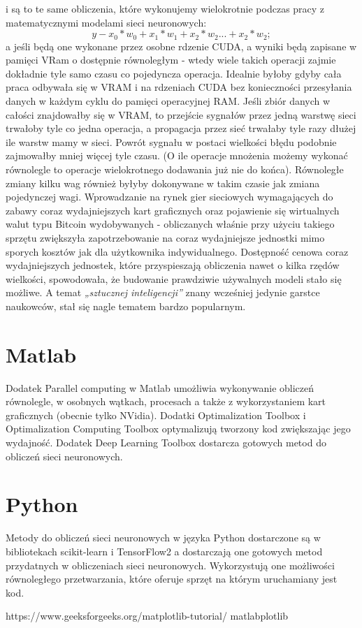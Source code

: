 i są to te same obliczenia, które wykonujemy wielokrotnie podczas pracy z matematycznymi modelami sieci neuronowych:
\begin{equation*}
  y - x_0*w_0 + x_1*w_1 +x_2*w_2 ... +x_2*w_2;
\end{equation*}
a jeśli będą one wykonane przez osobne rdzenie CUDA, a wyniki będą zapisane w pamięci VRam o dostępnie równoległym - wtedy wiele takich operacji zajmie dokładnie tyle samo czasu co pojedyncza operacja. Idealnie byłoby gdyby cała praca odbywała się w VRAM i na rdzeniach CUDA bez konieczności przesyłania danych w każdym cyklu do pamięci operacyjnej RAM. Jeśli zbiór danych w całości znajdowałby się w VRAM, to przejście sygnałów przez jedną warstwę sieci trwałoby tyle co jedna operacja, a propagacja przez sieć trwałaby tyle razy dłużej ile warstw mamy w sieci. Powrót sygnału w postaci wielkości błędu podobnie zajmowałby mniej więcej tyle czasu. (O ile operacje mnożenia możemy wykonać równolegle to operacje wielokrotnego dodawania już nie do końca). 
Równoległe zmiany kilku wag również byłyby dokonywane w takim czasie jak zmiana pojedynczej wagi.
\newline
Wprowadzanie na rynek gier sieciowych wymagających do zabawy coraz wydajniejszych kart graficznych oraz pojawienie się wirtualnych walut typu Bitcoin wydobywanych - obliczanych właśnie przy użyciu takiego sprzętu zwiększyła zapotrzebowanie na coraz wydajniejsze jednostki mimo sporych kosztów jak dla użytkownika indywidualnego. 
\newline
Dostępność cenowa coraz wydajniejszych jednostek, które przyspieszają obliczenia nawet o kilka rzędów wielkości, spowodowała, że budowanie prawdziwie używalnych modeli stało się możliwe. A temat \textit{„sztucznej inteligencji”} znany wcześniej jedynie garstce naukowców, stał się nagle tematem bardzo popularnym. 

\section{Matlab}
Dodatek Parallel computing w Matlab umożliwia wykonywanie obliczeń równolegle, w osobnych wątkach, procesach a także z wykorzystaniem kart graficznych (obecnie tylko NVidia). Dodatki Optimalization Toolbox i Optimalization Computing Toolbox optymalizują tworzony kod zwiększając jego wydajność. Dodatek Deep Learning Toolbox dostarcza gotowych metod do obliczeń sieci neuronowych.

\section{Python}
Metody do obliczeń sieci neuronowych w języka Python dostarczone są w bibliotekach scikit-learn i TensorFlow2 a dostarczają one gotowych metod przydatnych w obliczeniach sieci neuronowych. Wykorzystują one możliwości równoległego przetwarzania, które oferuje sprzęt na którym uruchamiany jest kod.

https://www.geeksforgeeks.org/matplotlib-tutorial/
matlabplotlib 